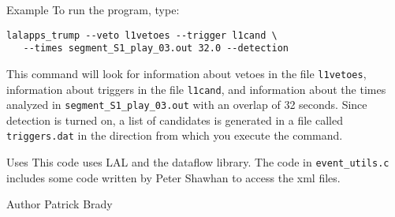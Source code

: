 \begin{entry}
\item[Example]
To run the program,  type:
\begin{verbatim}
lalapps_trump --veto l1vetoes --trigger l1cand \ 
   --times segment_S1_play_03.out 32.0 --detection
\end{verbatim}
This command will look for information about vetoes in the file
\verb$l1vetoes$,  information about triggers in the file
\verb$l1cand$,  and information about the times analyzed in
\verb$segment_S1_play_03.out$ with an overlap of 32 seconds.  Since
detection is turned on,  a list of candidates is generated in a file
called \verb$triggers.dat$ in the direction from which you execute the
command. 

\item[Uses] This code uses LAL and the dataflow library.  The code in
\verb$event_utils.c$ includes some code written by Peter Shawhan to
access the xml files.   
\item[Author]
Patrick Brady 

\end{entry}
